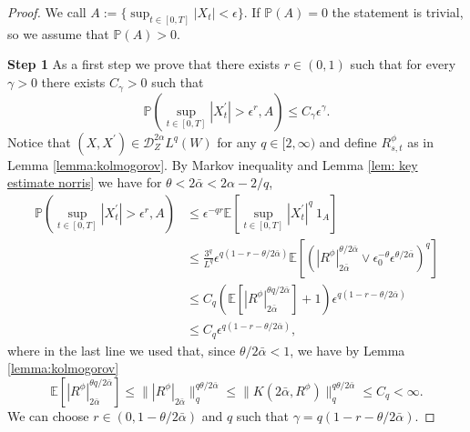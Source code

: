 \documentclass[11pt,a4paper]{article}
\theoremstyle{plain}
\begin{document}
\begin{proof}
We call $A := \{\sup_{t\in [0,T]}|X_t| < \epsilon\}$.
If $\mathbb{P}(A) = 0$ the statement is trivial, so we assume that $\mathbb{P}(A) > 0$.

    \textbf{Step 1} As a first step we prove that there exists $r\in (0,1)$ such that for every $\gamma > 0$ there exists $C_{\gamma} > 0$ such that
    \begin{equation*}
        \mathbb{P}\left(
        \sup_{t\in[0,T]}|X^{\prime}_t| > \epsilon^r,
        A
        \right)
        \leq C_{\gamma}\epsilon^{\gamma}.
    \end{equation*} 
    Notice that $(X,X^{\prime}) \in \mathscr{D}_{Z}^{2\alpha}L^{q}(W)$ { for any $q \in [2,\infty)$ and define $R^\phi_{s,t}$ as in Lemma \ref{lemma:kolmogorov}}.
    By Markov inequality and Lemma \ref{lem: key estimate norris} we have for $\theta < 2\bar{\alpha} < 2\alpha - {2}/q$,
    \begin{align*}
        \mathbb{P}\left(
        \sup_{t\in[0,T]}|X^{\prime}_t| > \epsilon^r,
        A
        \right)
        & \leq 
        \epsilon^{-qr}\mathbb{E}\left[\sup_{t\in[0,T]}|X^{\prime}_t|^q \ 1_A \right]\\
        & \leq \frac{3^q}{L^q}\epsilon^{q(1-r-\theta/2\bar{\alpha})}\mathbb{E}\left[
         \left(
         |R^\phi|_{2\bar{\alpha}}^{\theta/2\bar{\alpha}}
         \vee \epsilon_0^{-\theta}\epsilon^{\theta/2\bar{\alpha}}
        \right)^q
        \right]\\
        & \leq C_q \left(
        \mathbb{E}[
        |R^\phi|_{2\bar{\alpha}}^{\theta q / 2\bar{\alpha}}
        ]+1
        \right)
        \epsilon^{q(1-r-\theta/2\bar{\alpha})}\\
        & \leq C_q 
        \epsilon^{q(1-r-\theta/2\bar{\alpha})},
    \end{align*} 
    where in the last line we used that, since $\theta  / 2\bar{\alpha} < 1$, we have by Lemma \ref{lemma:kolmogorov}
    \begin{equation*}
        \mathbb{E}[
        |R^\phi|_{2\bar{\alpha}}^{\theta q / 2\bar{\alpha}}
        ]
        \leq 
        \||R^\phi|_{2\bar{\alpha}}\|_q^{q\theta / 2\bar{\alpha}}
        { \leq
        \| K(2 \bar\alpha,R^\phi) \|_q^{q\theta / 2\bar{\alpha}}
        }
        \leq C_q < \infty.
    \end{equation*}
    We can choose $r \in (0,1-\theta/2\bar{\alpha})$ and $q$ such that $\gamma =q(1-r-\theta/2\bar{\alpha})$.


\end{proof}
\end{document}
